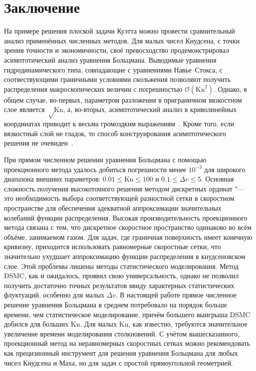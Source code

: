\documentclass[a4paper,12pt]{article}
\newcommand{\Kn}{\mathrm{Kn}}
\begin{document}
\section{Заключение}

На примере решения плоской задачи Куэтта можно провести сравнительный анализ применённых численных методов.
Для малых чисел Кнудсена, с точки зрения точности и экономичности, своё превосходство продемонстрировал
асимптотический анализ уравнения Больцмана.
Выводимые уравнения гидродинамического типа, совпадающие с уравнениями Навье--Стокса,
с соотвествующими граничными условиями скольжения позволяют получить
распределения макроскопических величин с погрешностью \(\mathcal{O}(\Kn^2)\).
Однако, в общем случае, во-первых, параметром разложения в приграничном вязкостном слое является \(\sqrt\Kn\),
а, во-вторых, асимптотический анализ в криволинейных координатах приводит к весьма громоздким выражениям~\cite{Sone2002}.
Кроме того, если вязкостный слой не гладок,
то способ конструирования асимптотического решения не очевиден~\cite{Aoki2014}.

При прямом численном решении уравнения Больцмана с помощью проекционного метода удалось добиться погрешности менее \(10^{-3}\)
для широкого диапазона внешних параметров: \(0.01 \le \Kn \le 100\) и \(0.1 \le \Delta{v} \le 5\).
Основная сложность получения высокоточного решения методом дискретных ординат
"--- это необходимость выбора соответствующей разностной сетки в скоростном пространстве
для обеспечения адекватной аппроксимации значительных колебаний функции распределения.
Высокая производительность проекционного метода связана с тем,
что дискретное скоростное пространство одинаково во всём объёме, занимаемом газом.
Для задач, где граничная поверхность имеет конечную кривизну,
приходится использовать равномерные скоростные сетки,
что значительно ухудшает аппроксимацию функции распределения в кнудсеновском слое.
Этой проблемы лишены методы статистического моделирования.
Метод DSMC, как и ожидалось, проявил свою универсальность,
однако не позволил получить достаточно точных результатов ввиду характерных статистических флуктуаций,
особенно для малых \(\Delta{v}\).
В настоящей работе прямое численное решение уравнения Больцмана в среднем потребовало на порядок больше времени,
чем статистическое моделирование, причём большего выигрыша DSMC добился для больших \(\Kn\).
Для малых \(\Kn\), как известно, требуются значительное увеличение времени моделирования столкновений.
С учётом вышесказанного, проекционный метод на неравномерных скоростных сетках можно рекомендовать
как прецизионный инструмент для решения уравнения Больцмана для любых чисел Кнудсена и Маха,
но для задач с простой прямоугольной геометрией.

\appendix
\appendixpage



\printbibliography
\end{document}
